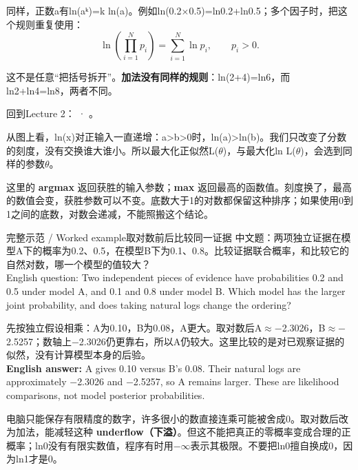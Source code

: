 同样，正数a有ln(aᵏ)=k ln(a)。例如ln(0.2\ensuremath{\times}0.5)=ln0.2+ln0.5；多个因子时，把这个规则重复使用：
\[
\ln\left(\prod_{i=1}^{N}p_i\right)=\sum_{i=1}^{N}\ln p_i,
\qquad p_i>0.\tag{M.14}
\]


这不是任意“把括号拆开”。\textbf{加法没有同样的规则}：ln(2+4)=ln6，而ln2+ln4=ln8，两者不同。


回到Lecture 2： · 。





从图上看，ln(x)对正输入一直递增：a>b>0时，ln(a)>ln(b)。我们只改变了分数的刻度，没有交换谁大谁小。所以最大化正似然L(\ensuremath{\theta})，与最大化ln L(\ensuremath{\theta})，会选到同样的参数\ensuremath{\theta}。


这里的 \textbf{argmax} 返回获胜的输入参数；\textbf{max} 返回最高的函数值。刻度换了，最高的数值会变，获胜参数可以不变。底数大于1的对数都保留这种排序；如果使用0到1之间的底数，对数会递减，不能照搬这个结论。


\begin{StudyBlock}{完整示范 / Worked example}{取对数前后比较同一证据}
中文题：两项独立证据在模型A下的概率为0.2、0.5，在模型B下为0.1、0.8。比较证据联合概率，和比较它的自然对数，哪一个模型的值较大？\\

English question: Two independent pieces of evidence have probabilities 0.2 and 0.5 under model A, and 0.1 and 0.8 under model B. Which model has the larger joint probability, and does taking natural logs change the ordering?


先按独立假设相乘：A为0.10，B为0.08，A更大。取对数后A\ensuremath{\approx}\ensuremath{-}2.3026，B\ensuremath{\approx}\ensuremath{-}2.5257；数轴上\ensuremath{-}2.3026仍更靠右，所以A仍较大。这里比较的是对已观察证据的似然，没有计算模型本身的后验。\\

\textbf{English answer:} A gives 0.10 versus B's 0.08. Their natural logs are approximately \ensuremath{-}2.3026 and \ensuremath{-}2.5257, so A remains larger. These are likelihood comparisons, not model posterior probabilities.
\end{StudyBlock}


电脑只能保存有限精度的数字，许多很小的数直接连乘可能被舍成0。取对数后改为加法，能减轻这种 \textbf{underflow（下溢）}。但这不能把真正的零概率变成合理的正概率；ln0没有有限实数值，程序有时用\ensuremath{-}\ensuremath{\infty}表示其极限。不要把ln0擅自换成0，因为ln1才是0。


